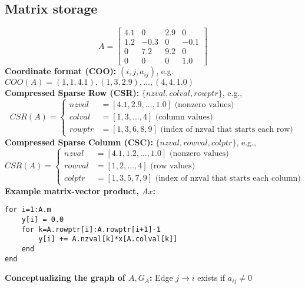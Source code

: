 \documentclass{article}
\begin{document}
\subsection{Matrix storage}
\begin{equation*}
    A = \begin{bmatrix}
        4.1 & 0 & 2.9  & 0\\
        1.2&-0.3 & 0 & -0.1\\
        0 & 7.2 & 9.2 & 0\\
        0 & 0 & 0 & 1.0
    \end{bmatrix}
\end{equation*}
\textbf{Coordinate format (COO):} $(i, j, a_{ij})$, e.g. $COO(A) = (1, 1, 4.1), (1, 3, 2.9), \dots, (4, 4, 1.0)$\\
\textbf{Compressed Sparse Row (CSR):} $\{nzval, colval, rowptr\}$, e.g., 
\begin{equation*}
    CSR(A) = \begin{cases}
        nzval &= [4.1, 2.9, \dots, 1.0] \textrm{ (nonzero values)}\\
        colval &= [1, 3, \dots, 4]\textrm{ (column values)}\\
        rowptr &= [1, 3, 6, 8, 9] \textrm{ (index of nzval that starts each row)}
    \end{cases}
\end{equation*}
\textbf{Compressed Sparse Column (CSC):} $\{nzval, rowval, colptr\}$, e.g., 
\begin{equation*}
    CSR(A) = \begin{cases}
        nzval &= [4.1, 1.2, \dots, 1.0] \textrm{ (nonzero values)}\\
        rowval &= [1, 2, \dots, 4]\textrm{ (row values)}\\
        colptr &= [1, 3, 5, 7, 9] \textrm{ (index of nzval that starts each column)}
    \end{cases}
\end{equation*}
\textbf{Example matrix-vector product, $Ax$:}

\begin{lstlisting}
for i=1:A.m
    y[i] = 0.0
    for k=A.rowptr[i]:A.rowptr[i+1]-1
        y[i] += A.nzval[k]*x[A.colval[k]]
    end
end
\end{lstlisting}
\textbf{Conceptualizing the graph of $A, G_A$:} Edge $j \rightarrow i$ exists if $a_{ij} \neq 0$
\end{document}
